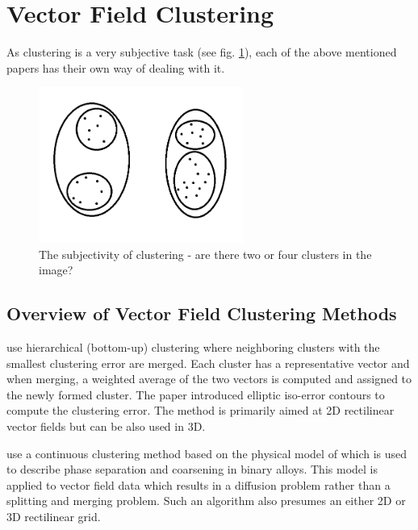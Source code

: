 \section{Vector Field Clustering}

As clustering is a very subjective task (see fig. \ref{fig:clustering_subjectivity}), each of the above mentioned papers has their own way of dealing with it.

\begin{figure}[h]
\centering
\includegraphics[width=0.6\textwidth]{./img/clustering_subjectivity.png}
\caption{The subjectivity of clustering - are there two or four clusters in the image?}
\label{fig:clustering_subjectivity}
\end{figure}

\subsection{Overview of Vector Field Clustering Methods}

\citet{Telea99} use hierarchical (bottom-up) clustering where neighboring clusters with the smallest clustering error are merged. Each cluster has a representative vector and when merging, a weighted average of the two vectors is computed and assigned to the newly formed cluster. The paper introduced elliptic iso-error contours to compute the clustering error. The method is primarily aimed at 2D rectilinear vector fields but can be also used in 3D.

\citet{Garcke00} use a continuous clustering method based on the physical model of \citet{CahnHilliard58} which is used to describe phase separation and coarsening in binary alloys. This model is applied to vector field data which results in a diffusion problem rather than a splitting and merging problem. Such an algorithm also presumes an either 2D or 3D rectilinear grid.

